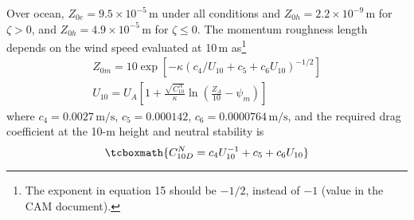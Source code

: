 \documentclass[a4paper,11pt]{article}
\begin{document}
Over ocean, $ Z_{0e} = 9.5\times 10^{-5}\,\mathrm{m}$ under all conditions and $Z_{0h} = 2.2\times 10^{-9}\,\mathrm{m}$ for $\zeta>0$, and $Z_{0h} = 4.9\times 10^{-5}\,\mathrm{m}$ for $\zeta\leq0$. The momentum roughness length depends on the wind speed evaluated at 10\,m as\footnote{The exponent in equation 15 should be $-1/2$, instead of $-1$ (value in the CAM document).}
\begin{gather}
Z_{0m} = 10 \exp\left[-\kappa\left(c_4/U_{10} + c_5 + c_6 U_{10} \right)^{-1/2}\right]\\
U_{10} = U_A \left[1 + \frac{\sqrt{C_{10}^N}}{\kappa}\ln\left(\frac{Z_A}{10} - \psi_m  \right)   \right]
\end{gather}
where $c_4 = 0.0027\,\mathrm{m/s}$, $c_5 = 0.000142$, $c_6 = 0.0000764\,\mathrm{m/s}$, and the required drag coefficient at the 10-m height and neutral stability is
\begin{equation}
\tcboxmath{
C_{10D}^N = c_4 U_{10}^{-1} + c_5 + c_6 U_{10} }
\end{equation}
\end{document}

